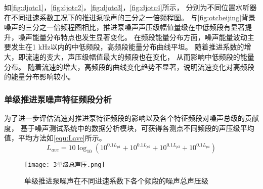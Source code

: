 如\autoref{fig:djotc1}，\autoref{fig:djotc2}，\autoref{fig:djotc3}，\autoref{fig:djotc4}所示，
分别为不同位置水听器在不同进速系数工况下的推进泵噪声的三分之一倍频程图。
与\autoref{fig:otcbeijing}背景噪声的三分之一倍频程图相比，推进泵噪声声压级幅值量级在中低频段有显著提升，噪声能量分布特点也发生显著变化。
在频段能量分布方面，噪声能量波动主要发生在1 kHz以内的中低频段，高频段能量分布曲线平坦。
随着推进系数的增大，即流速的变大，声压级幅值最大的频段也在变化，
从而影响中低频段的能量分布。
随着流速的增大，高频段的曲线变化趋势不显著，说明流速变化对高频段的能量分布影响较小。
\begin{comment}
\begin{figure}[htbp]
        \centering
        \subfigure[pic1.]{
        \texttt{[image: 3dj2\_otc.png]}
        }
\end{figure}
\addtocounter{figure}{-1}
\begin{figure}[htbp]
        \centering
        \addtocounter{figure}{1} 
        \subfigure[pic2.]{
        \texttt{[image: 3dj7\_otc.png]}
        }
\end{figure}
\addtocounter{figure}{-1}
\begin{figure}[htbp]
        \centering
        \addtocounter{figure}{1} 
        \vspace{0.02cm}
        \subfigure[pic2.]{
        \texttt{[image: 3dj6\_otc.png]}
        }
\end{figure}
\addtocounter{figure}{-1}
\begin{figure}[htbp]
        \centering
        \addtocounter{figure}{1} 
        \vspace{0.02cm}
        \subfigure[pic2.]{
        \texttt{[image: 3dj3\_otc.png]}
        }
        \caption{\label{fig:dj_modle}不同进速系数下单级推进泵水下噪声三分之一倍频程图}
\end{figure}
\end{comment}
\subsubsection{单级推进泵噪声特征频段分析}
为了进一步评估流速对推进泵特征频段的影响以及各个特征频段对噪声总级的贡献度，
基于噪声测试系统中的数据分析模块，可获得各测点不同频段的声压级平均值，平均方法如\autoref{equ:Lave}所示。
\begin{equation}
    \label{equ:Lave}
    L_{ave}=10\log_{10}\left ( {10^{0.1L_{p1}}}+{10^{0.1L_{p2}}}+{10^{0.1L_{p3}}}+{10^{0.1L_{p4}}}  \right ) 
\end{equation}
\begin{figure}[htbp]
    \centering
    \texttt{[image: 3单级总声压.png]}
    \caption{\label{fig:djtotal}单级推进泵噪声在不同进速系数下各个频段的噪声总声压级}
\end{figure}


